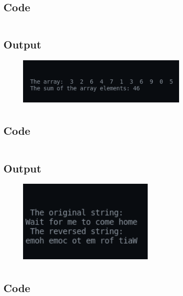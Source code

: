 \documentclass[12pt]{article}
\begin{document}
\newpage
\section{}
\subsection{Code}
\inputminted{c}{q7.c}
\subsection{Output}
\begin{figure}[h]
    \centering
    \includegraphics[width=0.75\textwidth]{7.png}
\end{figure}

\newpage
\section{}
\subsection{Code}
\inputminted{c}{q8.c}
\subsection{Output}
\begin{figure}[h]
    \centering
    \includegraphics[width=0.6\textwidth]{8.png}
\end{figure}
\newpage
\section{}
\subsection{Code}
\inputminted{c}{q9.c}
\end{document}
